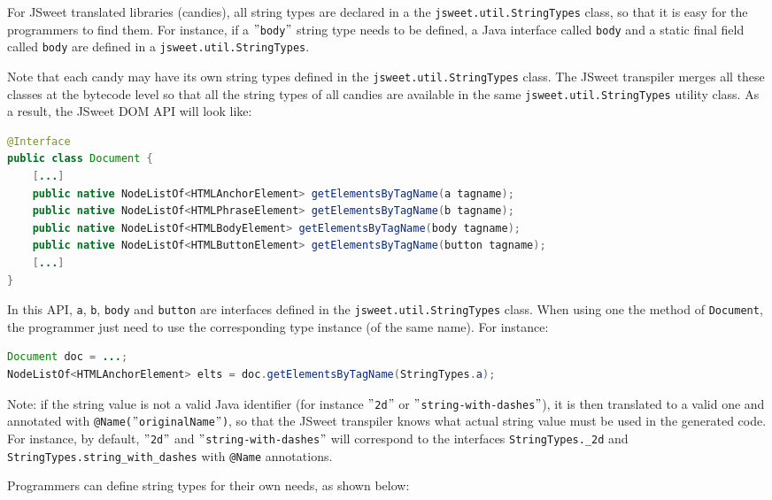 \documentclass[a4paper]{report}
\begin{document}
For JSweet translated libraries (candies), all string types are declared in a the \texttt{jsweet.\-util.\-String\-Types} class, so that it is easy for the programmers to find them. For instance, if a \texttt{$"$body$"$} string type needs to be defined, a Java interface called \texttt{body} and a static final field called \texttt{body} are defined in a \texttt{jsweet.\-util.\-String\-Types}.

Note that each candy may have its own string types defined in the \texttt{jsweet.\-util.\-String\-Types} class. The JSweet transpiler merges all these classes at the bytecode level so that all the string types of all candies are available in the same \texttt{jsweet.\-util.\-String\-Types} utility class. As a result, the JSweet DOM API will look like:

\begin{lstlisting}[language=Java]
@Interface
public class Document {
	[...]
	public native NodeListOf<HTMLAnchorElement> getElementsByTagName(a tagname);
	public native NodeListOf<HTMLPhraseElement> getElementsByTagName(b tagname);
	public native NodeListOf<HTMLBodyElement> getElementsByTagName(body tagname);
	public native NodeListOf<HTMLButtonElement> getElementsByTagName(button tagname);
	[...]
}
\end{lstlisting}

In this API, \texttt{a}, \texttt{b}, \texttt{body} and \texttt{button} are interfaces defined in the \texttt{jsweet.\-util.\-String\-Types} class. When using one the method of \texttt{Document}, the programmer just need to use the corresponding type instance (of the same name). For instance:

\begin{lstlisting}[language=Java]
Document doc = ...;
NodeListOf<HTMLAnchorElement> elts = doc.getElementsByTagName(StringTypes.a);
\end{lstlisting}

Note: if the string value is not a valid Java identifier (for instance \texttt{$"$2d$"$} or \texttt{$"$string-with-dashes$"$}), it is then translated to a valid one and annotated with \texttt{@Name($"$originalName$"$)}, so that the JSweet transpiler knows what actual string value must be used in the generated code. For instance, by default, \texttt{$"$2d$"$} and \texttt{$"$string-with-dashes$"$} will correspond to the interfaces \texttt{StringTypes.\_2d} and \texttt{StringTypes.string\_with\_dashes} with \texttt{@Name} annotations.

Programmers can define string types for their own needs, as shown below:
\end{document}
